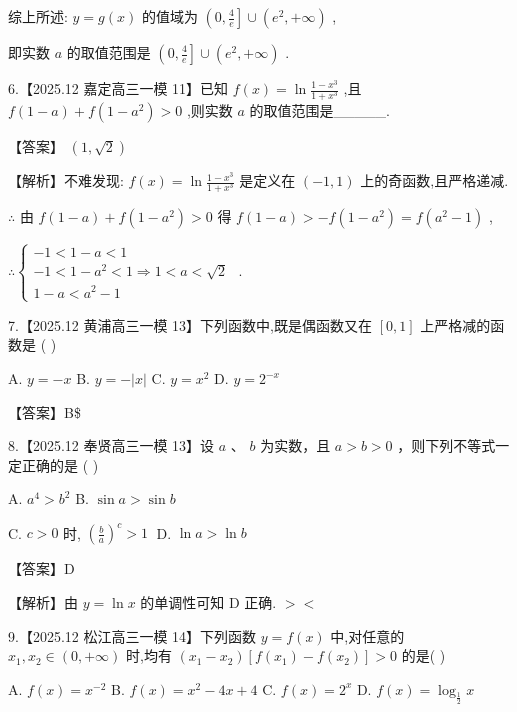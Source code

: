 \documentclass[10pt]{article}
\begin{document}
综上所述: \(y = g\left( x\right)\) 的值域为 \(\left( {0,\frac{4}{e}}\right\rbrack   \cup  \left( {{e}^{2}, + \infty }\right)\) ,

即实数 \(a\) 的取值范围是 \(\left( {0,\frac{4}{e}}\right\rbrack   \cup  \left( {{e}^{2}, + \infty }\right)\) .

6.【2025.12 嘉定高三一模 11】已知 \(f\left( x\right)  = \ln \frac{1 - {x}^{3}}{1 + {x}^{3}}\) ,且 \(f\left( {1 - a}\right)  + f\left( {1 - {a}^{2}}\right)  > 0\) ,则实数 \(a\) 的取值范围是\_\_\_\_\_.

【答案】 \(\left( {1,\sqrt{2}}\right)\)

【解析】不难发现: \(f\left( x\right)  = \ln \frac{1 - {x}^{3}}{1 + {x}^{3}}\) 是定义在 \(\left( {-1,1}\right)\) 上的奇函数,且严格递减.

\(\therefore\) 由 \(f\left( {1 - a}\right)  + f\left( {1 - {a}^{2}}\right)  > 0\) 得 \(f\left( {1 - a}\right)  >  - f\left( {1 - {a}^{2}}\right)  = f\left( {{a}^{2} - 1}\right)\) ,

\(\therefore \left\{  \begin{array}{l}  - 1 < 1 - a < 1 \\   - 1 < 1 - {a}^{2} < 1 \Rightarrow  1 < a < \sqrt{2} \\  1 - a < {a}^{2} - 1 \end{array}\right.\) .

7.【2025.12 黄浦高三一模 13】下列函数中,既是偶函数又在 \(\left\lbrack  {0,1}\right\rbrack\) 上严格减的函数是 ( )

A. \(y =  - x\) B. \(y =  - \left| x\right|\) C. \(y = {x}^{2}\) D. \(y = {2}^{-x}\)

【答案】B\$

8.【2025.12 奉贤高三一模 13】设 \(a\text{ 、 }b\) 为实数，且 \(a > b > 0\) ，则下列不等式一定正确的是 ( )

A. \({a}^{4} > {b}^{2}\) B. \(\sin a > \sin b\)

C. \(c > 0\) 时, \({\left( \frac{b}{a}\right) }^{c} > 1\;\) D. \(\ln a > \ln b\)

【答案】D

【解析】由 \(y = \ln x\) 的单调性可知 \(\mathrm{D}\) 正确. \(>  <\)

9.【2025.12 松江高三一模 14】下列函数 \(y = f\left( x\right)\) 中,对任意的 \({x}_{1},{x}_{2} \in  \left( {0, + \infty }\right)\) 时,均有 \(\left( {{x}_{1} - {x}_{2}}\right) \left\lbrack  {f\left( {x}_{1}\right)  - f\left( {x}_{2}\right) }\right\rbrack   > 0\) 的是( )

A. \(f\left( x\right)  = {x}^{-2}\) B. \(f\left( x\right)  = {x}^{2} - {4x} + 4\) C. \(f\left( x\right)  = {2}^{x}\) D. \(f\left( x\right)  = {\log }_{\frac{1}{2}}x\)
\end{document}
